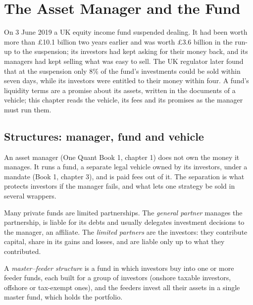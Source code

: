 \chapter{The Asset Manager and the Fund}\label{ch:fm:the-asset-manager-and-the-fund}

On 3 June 2019 a UK equity income fund suspended dealing. It had been worth more than £10.1 billion two years earlier and was worth £3.6 billion
in the run-up to the suspension; its investors had kept asking for their money back, and its managers had kept selling what was easy to sell.
The UK regulator later found that at the suspension only 8\% of the fund's investments could be sold within seven days, while its investors
were entitled to their money within four. A fund's liquidity terms are a promise about its assets, written in the documents of a vehicle; this
chapter reads the vehicle, its fees and its promises as the manager must run them.

\section{Structures: manager, fund and vehicle}

An asset manager (One Quant Book 1, chapter 1) does not own the money it manages. It runs a fund, a separate legal vehicle owned by its investors,
under a mandate (Book 1, chapter 3), and is paid fees out of it. The separation is what protects investors if the manager fails, and what lets
one strategy be sold in several wrappers.

\begin{definition}\label{def:fm:the-asset-manager-and-the-fund:gp}
Many private funds are limited partnerships. The \emph{general partner} manages the partnership, is liable for its debts
and usually delegates investment decisions to the manager, an affiliate. The \emph{limited partners} are the investors:
they contribute capital, share in its gains and losses, and are liable only up to what they contributed.
\end{definition}

\begin{definition}\label{def:fm:the-asset-manager-and-the-fund:master}
A \emph{master--feeder structure} is a fund in which investors buy into one or more feeder funds, each built
for a group of investors (onshore taxable investors, offshore or tax-exempt ones), and the feeders invest all their assets in a single master
fund, which holds the portfolio.
\end{definition}

